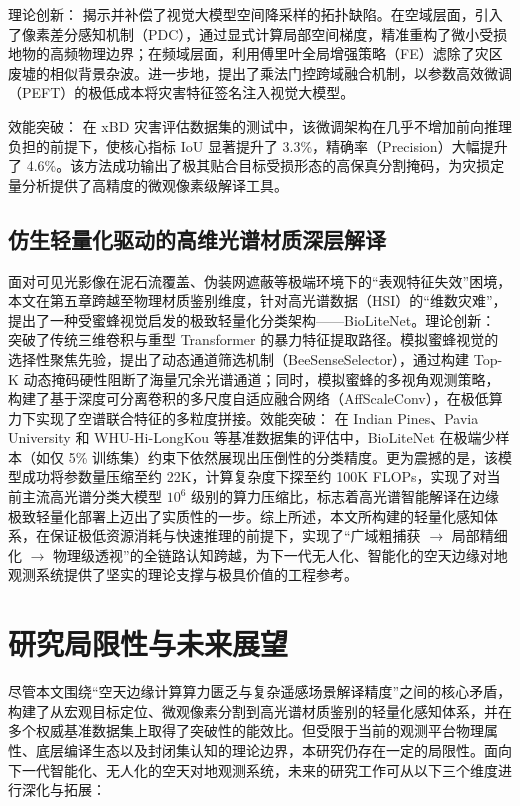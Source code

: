 理论创新： 揭示并补偿了视觉大模型空间降采样的拓扑缺陷。在空域层面，引入了像素差分感知机制（PDC），通过显式计算局部空间梯度，精准重构了微小受损地物的高频物理边界；在频域层面，利用傅里叶全局增强策略（FE）滤除了灾区废墟的相似背景杂波。进一步地，提出了乘法门控跨域融合机制，以参数高效微调（PEFT）的极低成本将灾害特征签名注入视觉大模型。

效能突破： 在 xBD 灾害评估数据集的测试中，该微调架构在几乎不增加前向推理负担的前提下，使核心指标 IoU 显著提升了 3.3\%，精确率（Precision）大幅提升了 4.6\%。该方法成功输出了极其贴合目标受损形态的高保真分割掩码，为灾损定量分析提供了高精度的微观像素级解译工具。

\subsection{仿生轻量化驱动的高维光谱材质深层解译}
面对可见光影像在泥石流覆盖、伪装网遮蔽等极端环境下的“表观特征失效”困境，本文在第五章跨越至物理材质鉴别维度，针对高光谱数据（HSI）的“维数灾难”，提出了一种受蜜蜂视觉启发的极致轻量化分类架构——BioLiteNet。理论创新： 突破了传统三维卷积与重型 Transformer 的暴力特征提取路径。模拟蜜蜂视觉的选择性聚焦先验，提出了动态通道筛选机制（BeeSenseSelector），通过构建 Top-K 动态掩码硬性阻断了海量冗余光谱通道；同时，模拟蜜蜂的多视角观测策略，构建了基于深度可分离卷积的多尺度自适应融合网络（AffScaleConv），在极低算力下实现了空谱联合特征的多粒度拼接。效能突破： 在 Indian Pines、Pavia University 和 WHU-Hi-LongKou 等基准数据集的评估中，BioLiteNet 在极端少样本（如仅 5\% 训练集）约束下依然展现出压倒性的分类精度。更为震撼的是，该模型成功将参数量压缩至约 22K，计算复杂度下探至约 100K FLOPs，实现了对当前主流高光谱分类大模型 $10^6$ 级别的算力压缩比，标志着高光谱智能解译在边缘极致轻量化部署上迈出了实质性的一步。综上所述，本文所构建的轻量化感知体系，在保证极低资源消耗与快速推理的前提下，实现了“广域粗捕获 $\rightarrow$ 局部精细化 $\rightarrow$ 物理级透视”的全链路认知跨越，为下一代无人化、智能化的空天边缘对地观测系统提供了坚实的理论支撑与极具价值的工程参考。

\section{研究局限性与未来展望}
尽管本文围绕“空天边缘计算算力匮乏与复杂遥感场景解译精度”之间的核心矛盾，构建了从宏观目标定位、微观像素分割到高光谱材质鉴别的轻量化感知体系，并在多个权威基准数据集上取得了突破性的能效比。但受限于当前的观测平台物理属性、底层编译生态以及封闭集认知的理论边界，本研究仍存在一定的局限性。面向下一代智能化、无人化的空天对地观测系统，未来的研究工作可从以下三个维度进行深化与拓展：


